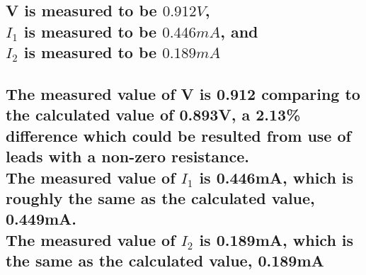 \documentclass{article}
\begin{document}
\subsection{V is measured to be $0.912V$, \\$I_1$ is measured to be $0.446mA$, and \\$I_2$ is measured to be $0.189mA$}
\subsection{The measured value of V is 0.912 comparing to the calculated value of 0.893V, a 2.13\% difference which could be resulted from use of leads with a non-zero resistance. \\The measured value of $I_1$ is 0.446mA, which is roughly the same as the calculated value, 0.449mA.\\The measured value of $I_2$ is 0.189mA, which is the same as the calculated value, 0.189mA}
\end{document}
